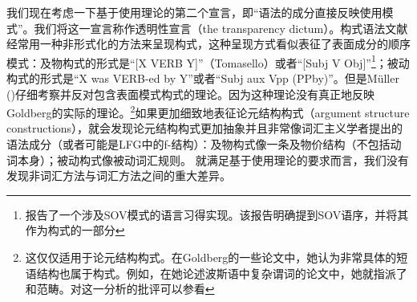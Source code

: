     我们现在考虑一下基于使用理论的第二个宣言，即“语法的成分直接反映使用模式”。我们将这一宣言称作透明性宣言（the transparency dictum）。构式语法文献经常用一种非形式化的方法来呈现构式，这种呈现方式看似表征了表面成分的顺序模式：及物构式的形式是“[X VERB Y]”（Tomasello）或者“[Subj V Obj]”\citep{Goldberg95a,Goldberg2006a}\footnote{%
  \citet[]{GCS2004a}报告了一个涉及SOV模式的语言习得实现。该报告明确提到SOV语序，并将其作为构式的一部分
}；被动构式的形式是“X was VERB-ed by Y”\citep[]{Tomasello2003a}或者“Subj aux Vpp (PPby)”\citep[]{Goldberg2006a}。但是Müller (\citeyear[\S~2]{Mueller2006d})仔细考察并反对包含表面模式构式的理论。因为这种理论没有真正地反映Goldberg的实际的理论。\footnote{%
这仅仅适用于论元结构构式。在Goldberg的一些论文中，她认为非常具体的短语结构也属于构式。例如，在她论述波斯语中复杂谓词的论文\citep{Goldberg2003a}中，她就指派了\vnullc 和\vbarc 范畴。对这一分析的批评可以参看
}如果更加细致地表征论元结构构式（argument structure constructions），就会发现论元结构构式更加抽象并且非常像词汇主义学者提出的语法成分（或者可能是LFG中的f-结构）：及物构式像一条及物价结构（不包括动词本身）；被动构式像被动词汇规则。
    就满足基于使用理论的要求而言，我们没有发现非词汇方法与词汇方法之间的重大差异。

